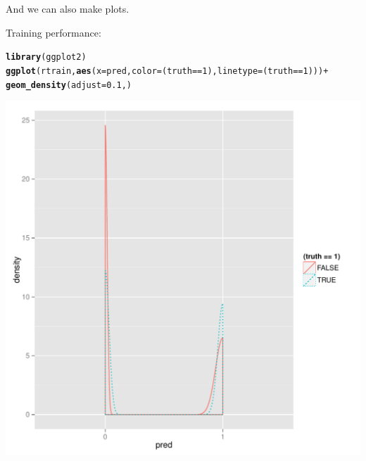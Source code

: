 \documentclass{article}\usepackage[]{graphicx}\usepackage[]{color}
\makeatletter
\def\maxwidth{ %
  \ifdim\Gin@nat@width>\linewidth
    \linewidth
  \else
    \Gin@nat@width
  \fi
}
\newcommand{\hlnum}[1]{\textcolor[rgb]{0.686,0.059,0.569}{#1}}%
\newcommand{\hlopt}[1]{\textcolor[rgb]{0,0,0}{#1}}%
\newcommand{\hlstd}[1]{\textcolor[rgb]{0.345,0.345,0.345}{#1}}%
\newcommand{\hlkwc}[1]{\textcolor[rgb]{0.333,0.667,0.333}{#1}}%
\newcommand{\hlkwd}[1]{\textcolor[rgb]{0.737,0.353,0.396}{\textbf{#1}}}%
\newenvironment{kframe}{%
 \def\at@end@of@kframe{}%
 \ifinner\ifhmode%
  \def\at@end@of@kframe{\end{minipage}}%
  \begin{minipage}{\columnwidth}%
 \fi\fi%
 \def\FrameCommand##1{\hskip\@totalleftmargin \hskip-\fboxsep
 \colorbox{shadecolor}{##1}\hskip-\fboxsep
     \hskip-\linewidth \hskip-\@totalleftmargin \hskip\columnwidth}%
 \MakeFramed {\advance\hsize-\width
   \@totalleftmargin\z@ \linewidth\hsize
   \@setminipage}}%
 {\par\unskip\endMakeFramed%
 \at@end@of@kframe}
\newenvironment{knitrout}{}{} %
\makeatother
\begin{document}
And we can also make plots.

Training performance:
\begin{knitrout}
\color{fgcolor}\begin{kframe}
\begin{alltt}
\hlkwd{library}\hlstd{(ggplot2)}
\hlkwd{ggplot}\hlstd{(rtrain,} \hlkwd{aes}\hlstd{(}\hlkwc{x}\hlstd{=pred,} \hlkwc{color}\hlstd{=(truth}\hlopt{==}\hlnum{1}\hlstd{),}\hlkwc{linetype}\hlstd{=(truth}\hlopt{==}\hlnum{1}\hlstd{)))} \hlopt{+}
   \hlkwd{geom_density}\hlstd{(}\hlkwc{adjust}\hlstd{=}\hlnum{0.1}\hlstd{,)}
\end{alltt}
\end{kframe}
\includegraphics[width=\maxwidth]{figure/plottrain} 

\end{knitrout}
\end{document}
